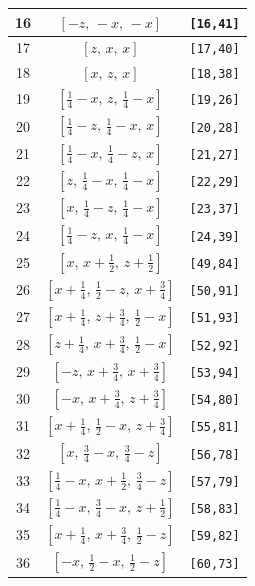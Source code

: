 \documentclass[fleqn,8pt]{jsarticle}
\begin{document}
\begin{longtable}{ccc}
16 & $\left[ - z,\, - x,\, - x \right]$ & {\tt [16,41]} \\ \hline
17 & $\left[ z,\, x,\, x \right]$ & {\tt [17,40]} \\ \hline
18 & $\left[ x,\, z,\, x \right]$ & {\tt [18,38]} \\ \hline
19 & $\left[ \frac{1}{4} - x,\, z,\, \frac{1}{4} - x \right]$ & {\tt [19,26]} \\ \hline
20 & $\left[ \frac{1}{4} - z,\, \frac{1}{4} - x,\, x \right]$ & {\tt [20,28]} \\ \hline
21 & $\left[ \frac{1}{4} - x,\, \frac{1}{4} - z,\, x \right]$ & {\tt [21,27]} \\ \hline
22 & $\left[ z,\, \frac{1}{4} - x,\, \frac{1}{4} - x \right]$ & {\tt [22,29]} \\ \hline
23 & $\left[ x,\, \frac{1}{4} - z,\, \frac{1}{4} - x \right]$ & {\tt [23,37]} \\ \hline
24 & $\left[ \frac{1}{4} - z,\, x,\, \frac{1}{4} - x \right]$ & {\tt [24,39]} \\ \hline
25 & $\left[ x,\, x + \frac{1}{2},\, z + \frac{1}{2} \right]$ & {\tt [49,84]} \\ \hline
26 & $\left[ x + \frac{1}{4},\, \frac{1}{2} - z,\, x + \frac{3}{4} \right]$ & {\tt [50,91]} \\ \hline
27 & $\left[ x + \frac{1}{4},\, z + \frac{3}{4},\, \frac{1}{2} - x \right]$ & {\tt [51,93]} \\ \hline
28 & $\left[ z + \frac{1}{4},\, x + \frac{3}{4},\, \frac{1}{2} - x \right]$ & {\tt [52,92]} \\ \hline
29 & $\left[ - z,\, x + \frac{3}{4},\, x + \frac{3}{4} \right]$ & {\tt [53,94]} \\ \hline
30 & $\left[ - x,\, x + \frac{3}{4},\, z + \frac{3}{4} \right]$ & {\tt [54,80]} \\ \hline
31 & $\left[ x + \frac{1}{4},\, \frac{1}{2} - x,\, z + \frac{3}{4} \right]$ & {\tt [55,81]} \\ \hline
32 & $\left[ x,\, \frac{3}{4} - x,\, \frac{3}{4} - z \right]$ & {\tt [56,78]} \\ \hline
33 & $\left[ \frac{1}{4} - x,\, x + \frac{1}{2},\, \frac{3}{4} - z \right]$ & {\tt [57,79]} \\ \hline
34 & $\left[ \frac{1}{4} - x,\, \frac{3}{4} - x,\, z + \frac{1}{2} \right]$ & {\tt [58,83]} \\ \hline
35 & $\left[ x + \frac{1}{4},\, x + \frac{3}{4},\, \frac{1}{2} - z \right]$ & {\tt [59,82]} \\ \hline
36 & $\left[ - x,\, \frac{1}{2} - x,\, \frac{1}{2} - z \right]$ & {\tt [60,73]} \\ \hline

\end{longtable}
\end{document}
